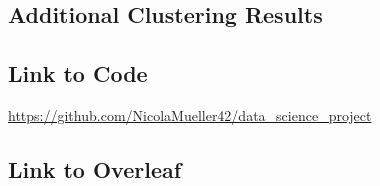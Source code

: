 \documentclass[conference]{IEEEtran}
\begin{document}
\subsection{Additional Clustering Results}


\subsection{Link to Code}
\url{https://github.com/NicolaMueller42/data_science_project}

\subsection{Link to Overleaf}
\end{document}
